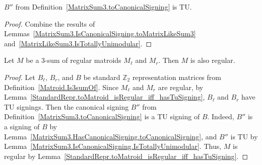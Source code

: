 \begin{lemma}
    \label{MatrixSum3.IsCanonicalSigning.IsTotallyUnimodular}
    \leanok
    $B''$ from Definition~\ref{MatrixSum3.toCanonicalSigning} is TU.
\end{lemma}

\begin{proof}
    \leanok
    Combine the results of Lemmas~\ref{MatrixSum3.IsCanonicalSigning.toMatrixLikeSum3} and~\ref{MatrixLikeSum3.IsTotallyUnimodular}.
\end{proof}

\begin{theorem}
    \label{Matroid.Is3sumOf.isRegular}
    \leanok
    Let $M$ be a $3$-sum of regular matroids $M_{\ell}$ and $M_{r}$. Then $M$ is also regular.
\end{theorem}

\begin{proof}
    \leanok
    Let $B_{\ell}$, $B_{r}$, and $B$ be standard $\mathbb{Z}_{2}$ representation matrices from Definition~\ref{Matroid.Is3sumOf}. Since $M_{\ell}$ and $M_{r}$ are regular, by Lemma~\ref{StandardRepr.toMatroid_isRegular_iff_hasTuSigning}, $B_{\ell}$ and $B_{r}$ have TU signings. Then the canonical signing $B''$ from Definition~\ref{MatrixSum3.toCanonicalSigning} is a TU signing of $B$. Indeed, $B''$ is a signing of $B$ by Lemma~\ref{MatrixSum3.HasCanonicalSigning.toCanonicalSigning}, and $B''$ is TU by Lemma~\ref{MatrixSum3.IsCanonicalSigning.IsTotallyUnimodular}. Thus, $M$ is regular by Lemma~\ref{StandardRepr.toMatroid_isRegular_iff_hasTuSigning}.
\end{proof}

